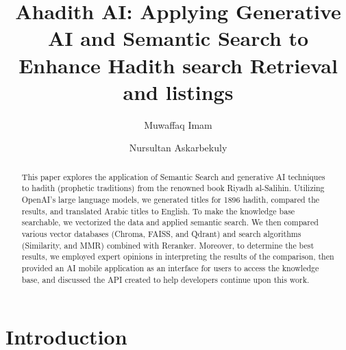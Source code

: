 \documentclass{svproc}
\begin{document}
\mainmatter              %
%
\title{Ahadith AI: Applying Generative AI and Semantic Search to Enhance Hadith search Retrieval and listings}
%
%
\author{Muwaffaq Imam \and  Nursultan Askarbekuly
}
%
%

%
\maketitle              %

\begin{abstract}
\label{Abstract}
This paper explores the application of Semantic Search and generative AI techniques to hadith (prophetic traditions) from the renowned book Riyadh al-Salihin. Utilizing OpenAI's large language models, we generated titles for 1896 hadith, compared the results, and translated Arabic titles to English. To make the knowledge base searchable, we vectorized the data and applied semantic search. We then compared various vector databases (Chroma, FAISS, and Qdrant) and search algorithms (Similarity, and MMR) combined with Reranker. Moreover, to determine the best results, we employed expert opinions in interpreting the results of the comparison, then provided an AI mobile application as an interface for users to access the knowledge base, and discussed the API created to help developers continue upon this work.


\end{abstract}
%
\section{Introduction}\label{sec:introduction}
\end{document}
